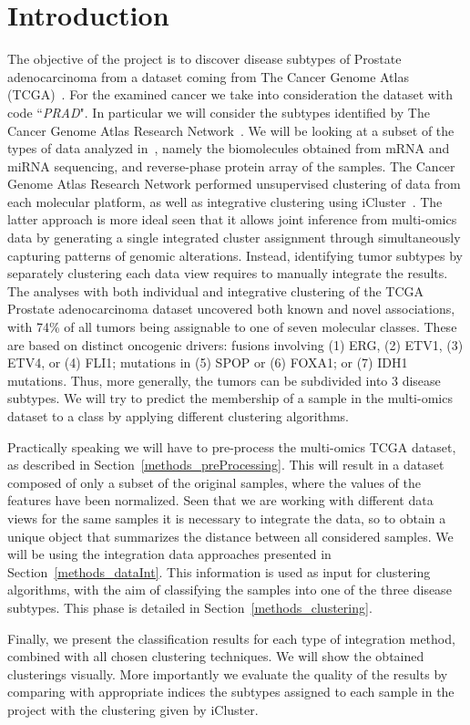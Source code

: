 \chapter{Introduction}\label{introduction}
The objective of the project is to discover disease subtypes of Prostate adenocarcinoma from a dataset coming from The Cancer Genome Atlas (TCGA)~\cite{hutter2018TCGA}. For the examined cancer we take into consideration the dataset with code ``\textit{PRAD}". In particular we will consider the subtypes identified by The Cancer Genome Atlas Research Network~\cite{abeshouse2015molecularPRAD}. We will be looking at a subset of the types of data analyzed in~\cite{abeshouse2015molecularPRAD}, namely the biomolecules  obtained from mRNA and miRNA sequencing, and reverse-phase protein array of the samples. The Cancer Genome Atlas Research Network performed unsupervised
clustering of data from each molecular platform, as well as integrative clustering using iCluster~\cite{shen2009integrative}. The latter approach is more ideal seen that it allows joint inference from multi-omics data by generating a single integrated cluster assignment through simultaneously capturing patterns of genomic alterations. Instead, identifying tumor subtypes by separately clustering each data view requires to manually integrate the results.
The analyses with both individual and integrative clustering of the TCGA Prostate adenocarcinoma dataset uncovered both known and novel associations, with 74\% of all tumors being assignable to one of seven molecular classes. These are based on distinct oncogenic drivers: fusions involving (1) ERG, (2) ETV1, (3) ETV4, or (4) FLI1; mutations in (5) SPOP
or (6) FOXA1; or (7) IDH1 mutations. Thus, more generally, the tumors can be subdivided into 3 disease subtypes. We will try to predict the membership of a sample in the multi-omics dataset to a class by applying different clustering algorithms.\newline

Practically speaking we will have to pre-process the multi-omics TCGA dataset, as described in Section~\ref{methods_preProcessing}. This will result in a dataset composed of only a subset of the original samples, where the values of the features have been normalized. Seen that we are working with different data views for the same samples it is necessary to integrate the data, so to obtain a unique object that summarizes the distance between all considered samples. We will be using the integration data approaches presented in Section~\ref{methods_dataInt}. This information is used as input for clustering algorithms, with the aim of classifying the samples into one of the three disease subtypes. This phase is detailed in Section~\ref{methods_clustering}.

Finally, we present the classification results for each type of integration method, combined with all chosen clustering techniques. We will show the obtained clusterings visually. More importantly we evaluate the quality of the results by comparing with appropriate indices the subtypes assigned to each sample in the project with the clustering given by iCluster.